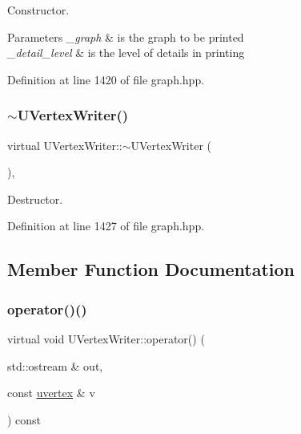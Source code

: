 Constructor. 


\begin{DoxyParams}{Parameters}
{\em \+\_\+graph} & is the graph to be printed \\
\hline
{\em \+\_\+detail\+\_\+level} & is the level of details in printing \\
\hline
\end{DoxyParams}


Definition at line 1420 of file graph.\+hpp.

\mbox{\label{classUVertexWriter_aa417baae07ce273a00e8def01d073621}} 
\subsubsection{\texorpdfstring{$\sim$\+U\+Vertex\+Writer()}{~UVertexWriter()}}
{\footnotesize\ttfamily virtual U\+Vertex\+Writer\+::$\sim$\+U\+Vertex\+Writer (\begin{DoxyParamCaption}{ }\end{DoxyParamCaption})\hspace{0.3cm}{\ttfamily [inline]}, {\ttfamily [virtual]}}



Destructor. 



Definition at line 1427 of file graph.\+hpp.



\subsection{Member Function Documentation}
\mbox{\label{classUVertexWriter_a218953915a49ce9852c000df1476601a}} 
\subsubsection{\texorpdfstring{operator()()}{operator()()}}
{\footnotesize\ttfamily virtual void U\+Vertex\+Writer\+::operator() (\begin{DoxyParamCaption}\item[{std\+::ostream \&}]{out,  }\item[{const \hyperlink{graph_8hpp_a56f73e449b2c08195207c387d6c422cd}{uvertex} \&}]{v }\end{DoxyParamCaption}) const\hspace{0.3cm}{\ttfamily [pure virtual]}}




